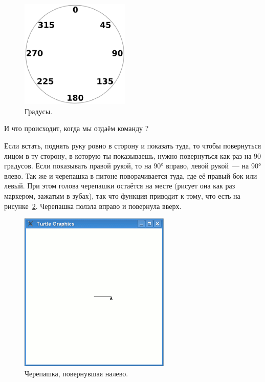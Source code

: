 \begin{figure}
\begin{center}
\includegraphics[width=52mm]{../en/figure14.eps}
\end{center}
\caption{Градусы.}\label{fig14}
\end{figure}

И что происходит, когда мы отдаём команду ?

Если встать, поднять руку ровно в сторону и показать туда, то чтобы повернуться лицом в ту сторону, в которую ты показываешь, нужно повернуться как раз на 90 градусов. Если показывать правой рукой, то на 90° вправо, левой рукой — на 90° влево. Так же и черепашка в питоне поворачивается туда, где её правый бок или левый. При этом голова черепашки остаётся на месте (рисует она как раз маркером, зажатым в зубах), так что функция  приводит к тому, что есть на рисунке \ref{fig15}. Черепашка ползла вправо и повернула вверх.

\begin{figure}
\begin{center}
\includegraphics[width=72mm]{../en/figure15.eps}
\end{center}
\caption{Черепашка, повернувшая налево.}\label{fig15}
\end{figure}

